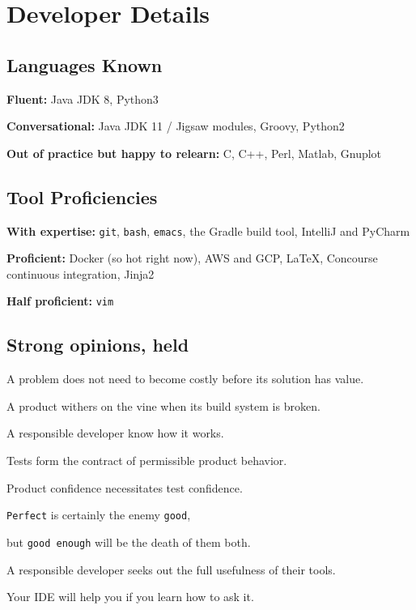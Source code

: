 \documentclass[10pt,letterpaper]{article}
\newcommand\ttt\texttt
\renewenvironment{itemize}{
  \begin{list}{}{
    \setlength{\leftmargin}{1.5em}
    \setlength{\itemsep}{0.25em}
    \setlength{\parskip}{0pt}
    \setlength{\parsep}{0.25em}
  }
}{
  \end{list}
}
\begin{document}

\newpage

\section*{Developer Details}
\subsection*{Languages Known}
\begin{itemize}
  \item \textbf{Fluent:}
    Java JDK 8,
    Python3
  \item \textbf{Conversational:}
    Java JDK 11 / Jigsaw modules,
    Groovy,
    Python2
  \item \textbf{Out of practice but happy to relearn:}
    C,
    C++,
    Perl,
    Matlab,
    Gnuplot
\end{itemize}

\subsection*{Tool Proficiencies}
\begin{itemize}
  \item \textbf{With expertise:}
    \ttt{git},
    \ttt{bash},
    \ttt{emacs},
    the Gradle build tool,
    IntelliJ and PyCharm
  \item \textbf{Proficient:} Docker (so hot right now),
    AWS and GCP,
    \LaTeX,
    Concourse continuous integration,
    Jinja2
  \item \textbf{Half proficient:}
    \ttt{vim}
\end{itemize}

\newcommand{\opinionsPar}{\par\vspace{-.3em}\quad}
\newcommand{\gah}[1]{\ttt{#1}}
\subsection*{Strong opinions, held}
\begin{itemize}
  \item A problem does not need to become costly before its solution has value.
  \item A product withers on the vine when its build system is broken.\opinionsPar
    A responsible developer know how it works.
  \item Tests form the contract of permissible product behavior.\opinionsPar
    Product confidence necessitates test confidence.
  \item \gah{Perfect} is certainly the enemy \gah{good},\opinionsPar
    but \gah{good enough} will be the death of them both.
  \item A responsible developer seeks out the full usefulness of their tools.\opinionsPar
    Your IDE will help you if you learn how to ask it.
\end{itemize}
\end{document}
